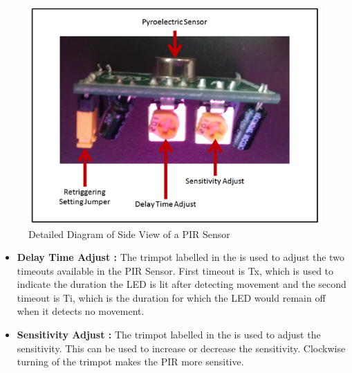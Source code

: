 \documentclass[a4paper,12 pt]{article}
\begin{document}
\begin{figure}[h]
\begin{center}
\includegraphics[scale=0.7]{sens.png}
\caption{Detailed Diagram of Side View of a PIR Sensor}
\label{fig:5}
\end{center}
\end{figure}
\begin{itemize}
\item \textbf{Delay Time Adjust :} The trimpot labelled in the  is used to adjust the two timeouts available in the PIR Sensor. First timeout is Tx, which is used to indicate the duration the LED is lit after detecting movement and the second timeout is Ti, which is the duration for which the LED would remain off when it detects no movement.
\item \textbf{Sensitivity Adjust :} The trimpot labelled in the  is used to adjust the sensitivity. This can be used to increase or decrease the sensitivity. Clockwise turning of the trimpot makes the PIR more sensitive.
\end{itemize}
\end{document}

